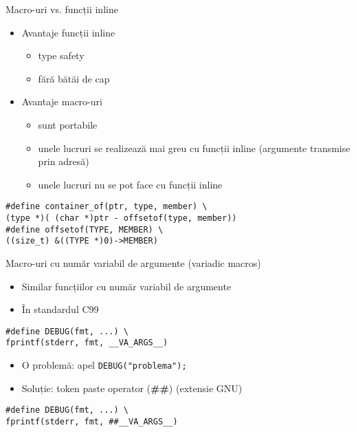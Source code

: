 \documentclass{beamer}
\begin{document}
\begin{frame}{Macro-uri vs. funcții inline}
	\begin{itemize}
		\item Avantaje funcții inline
			\begin{itemize}
				\item type safety
				\item fără bătăi de cap
			\end{itemize}
		\item Avantaje macro-uri
			\begin{itemize}
				\item sunt portabile
				\item unele lucruri se realizează mai greu cu funcții inline
	(argumente transmise prin adresă)
				\item unele lucruri nu se pot face cu funcții inline
			\end{itemize}
	\end{itemize}

	\begin{beamerboxesrounded}[lower=block body,shadow=true]{}
		\texttt{\#define container\_of(ptr, type, member) \textbackslash{} \\
\hlstd{}\hlstd{\ \ \ \ }\hlstd{}(type *)( (char *)ptr -
offsetof(type, member)) \\
\#define offsetof(TYPE, MEMBER) \textbackslash{} \\
\hlstd{}\hlstd{\ \ \ \ }\hlstd{}((size\_t) \&((TYPE *)0)-\textgreater{}MEMBER)
		}
	\end{beamerboxesrounded}

\end{frame}

\begin{frame}{Macro-uri cu număr variabil de argumente (variadic macros)}
	\begin{itemize}
		\item Similar funcțiilor cu număr variabil de argumente
		\item În standardul C99
	\end{itemize}

	\begin{beamerboxesrounded}[lower=block body,shadow=true]{}
\texttt{\#define DEBUG(fmt, ...) \textbackslash{} \\
\hlstd{}\hlstd{\ \ \ \ \ \ \ \ }\hlstd{}fprintf(stderr, fmt, \_\_VA\_ARGS\_\_)}
	\end{beamerboxesrounded}

	\begin{itemize}
		\item O problemă: apel \texttt{DEBUG("problema");}
		\item Soluție: token paste operator (\textbf{\#\#}) (extensie GNU)
	\end{itemize}

	\begin{beamerboxesrounded}[lower=block body,shadow=true]{}
\texttt{\#define DEBUG(fmt, ...) \textbackslash{} \\
\hlstd{}\hlstd{\ \ \ \ \ \ \ \ }\hlstd{}fprintf(stderr, fmt, \#\#\_\_VA\_ARGS\_\_)}
	\end{beamerboxesrounded}
\end{frame}
\end{document}
